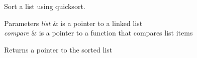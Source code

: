 Sort a list using quicksort. 


\begin{DoxyParams}{Parameters}
{\em list} & is a pointer to a linked list \\
\hline
{\em compare} & is a pointer to a function that compares list items \\
\hline
\end{DoxyParams}
\begin{DoxyReturn}{Returns}
a pointer to the sorted list 
\end{DoxyReturn}
